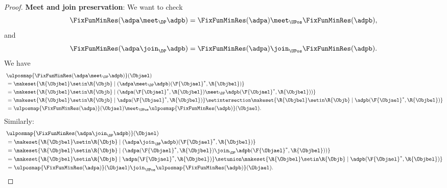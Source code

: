 \begin{proof}
    \textbf{Meet and join preservation}:
    We want to check
    \begin{equation}
        \FixFunMinRes(\adpa \meet_\DP \adpb)=\FixFunMinRes(\adpa) \meet_\UPos \FixFunMinRes(\adpb),
    \end{equation}
    and
    \begin{equation}
        \FixFunMinRes(\adpa \join_\DP \adpb)=\FixFunMinRes(\adpa) \join_\UPos \FixFunMinRes(\adpb).
    \end{equation}
    We have
    \begin{equation}
        \begin{aligned}
            ~ &
            \ulposmap{\FixFunMinRes(\adpa \meet_\DP \adpb)}(\Objael) \\
              & =\makeset{ \R{\Objbel} \setin \R{\Objb} \mid (\adpa \meet_\DP \adpb)(\F{\Objael}^*,\R{\Objbel})} \\
              & =\makeset{ \R{\Objbel} \setin \R{\Objb} \mid (\adpa(\F{\Objael}^*,\R{\Objbel})\meet_\DP \adpb(\F{\Objael}^*,\R{\Objbel}))} \\
              & =\makeset{ \R{\Objbel} \setin \R{\Objb} \mid \adpa(\F{\Objael}^*,\R{\Objbel})} \setintersection \makeset{ \R{\Objbel} \setin \R{\Objb} \mid  \adpb(\F{\Objael}^*,\R{\Objbel})} \\
              & =\ulposmap{\FixFunMinRes(\adpa)}(\Objael) \meet_\UPos \ulposmap{\FixFunMinRes(\adpb)}(\Objael).
        \end{aligned}
    \end{equation}
    Similarly:
    \begin{equation}
        \begin{aligned}
            ~ & \ulposmap{\FixFunMinRes(\adpa \join_\DP \adpb)}(\Objael) \\
              & =\makeset{ \R{\Objbel} \setin \R{\Objb} \mid (\adpa \join_\DP \adpb)(\F{\Objael}^*,\R{\Objbel})} \\
              & =\makeset{ \R{\Objbel} \setin \R{\Objb} \mid (\adpa(\F{\Objael}^*,\R{\Objbel})\join_\DP \adpb(\F{\Objael}^*,\R{\Objbel}))} \\
              & =\makeset{ \R{\Objbel} \setin \R{\Objb} \mid \adpa(\F{\Objael}^*,\R{\Objbel})} \setunion \makeset{ \R{\Objbel} \setin \R{\Objb} \mid  \adpb(\F{\Objael}^*,\R{\Objbel})} \\
              & =\ulposmap{\FixFunMinRes(\adpa)}(\Objael) \join_\UPos \ulposmap{\FixFunMinRes(\adpb)}(\Objael).
        \end{aligned}
    \end{equation}


\end{proof}
